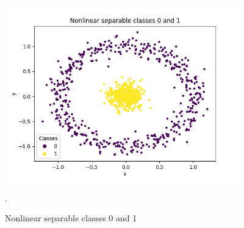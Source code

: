 \documentclass[../Main/thesis.tex]{subfiles}
\begin{document}
\begin{figure}[H] %
   \centering
   \includegraphics[width=4in]{../fig/nonlinearseparable.png} 
   \caption{Nonlinear separable classes 0 and 1}.
   \label{fig:kernelsvm}
\end{figure}
\end{document}
